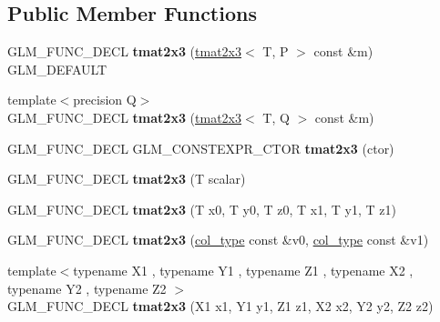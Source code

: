\subsection*{Public Member Functions}
\begin{DoxyCompactItemize}
\item 
\mbox{\label{structglm_1_1tmat2x3_a8552e4158f1d2e3fa2aac635585e7f94}} 
G\+L\+M\+\_\+\+F\+U\+N\+C\+\_\+\+D\+E\+CL {\bfseries tmat2x3} (\hyperlink{structglm_1_1tmat2x3}{tmat2x3}$<$ T, P $>$ const \&m) G\+L\+M\+\_\+\+D\+E\+F\+A\+U\+LT
\item 
\mbox{\label{structglm_1_1tmat2x3_ae12411a80e806874d766c81fcb5b55b3}} 
{\footnotesize template$<$precision Q$>$ }\\G\+L\+M\+\_\+\+F\+U\+N\+C\+\_\+\+D\+E\+CL {\bfseries tmat2x3} (\hyperlink{structglm_1_1tmat2x3}{tmat2x3}$<$ T, Q $>$ const \&m)
\item 
\mbox{\label{structglm_1_1tmat2x3_a482495a0bffdab216b44ed01cfe5a5ef}} 
G\+L\+M\+\_\+\+F\+U\+N\+C\+\_\+\+D\+E\+CL G\+L\+M\+\_\+\+C\+O\+N\+S\+T\+E\+X\+P\+R\+\_\+\+C\+T\+OR {\bfseries tmat2x3} (ctor)
\item 
\mbox{\label{structglm_1_1tmat2x3_aec88961ebded543fe8c8ebaf9494f554}} 
G\+L\+M\+\_\+\+F\+U\+N\+C\+\_\+\+D\+E\+CL {\bfseries tmat2x3} (T scalar)
\item 
\mbox{\label{structglm_1_1tmat2x3_a51d97af8b49ffdf7ad2b75542cbcbfdc}} 
G\+L\+M\+\_\+\+F\+U\+N\+C\+\_\+\+D\+E\+CL {\bfseries tmat2x3} (T x0, T y0, T z0, T x1, T y1, T z1)
\item 
\mbox{\label{structglm_1_1tmat2x3_a4321710182d684f5fd821657c2c950ec}} 
G\+L\+M\+\_\+\+F\+U\+N\+C\+\_\+\+D\+E\+CL {\bfseries tmat2x3} (\hyperlink{structglm_1_1tvec3}{col\+\_\+type} const \&v0, \hyperlink{structglm_1_1tvec3}{col\+\_\+type} const \&v1)
\item 
\mbox{\label{structglm_1_1tmat2x3_ac677b215b77c91b891d953c3a22e599e}} 
{\footnotesize template$<$typename X1 , typename Y1 , typename Z1 , typename X2 , typename Y2 , typename Z2 $>$ }\\G\+L\+M\+\_\+\+F\+U\+N\+C\+\_\+\+D\+E\+CL {\bfseries tmat2x3} (X1 x1, Y1 y1, Z1 z1, X2 x2, Y2 y2, Z2 z2)

\end{DoxyCompactItemize}
